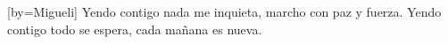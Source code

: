 [by={Migueli}]
\beginverse
Yendo contigo nada me inquieta,
marcho con paz y fuerza.
Yendo contigo todo se espera, 
cada mañana es nueva.
\endverse
\endsong
